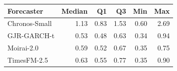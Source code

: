 \begin{tabular}{lrrrrr}
\toprule
Forecaster & Median & Q1 & Q3 & Min & Max \\
\midrule
  Chronos-Small & 1.13 & 0.83 & 1.53 & 0.60 & 2.69 \\
  GJR-GARCH-t & 0.53 & 0.48 & 0.63 & 0.34 & 0.94 \\
  Moirai-2.0 & 0.59 & 0.52 & 0.67 & 0.35 & 0.75 \\
  TimesFM-2.5 & 0.63 & 0.55 & 0.77 & 0.35 & 0.90 \\
\bottomrule
\end{tabular}